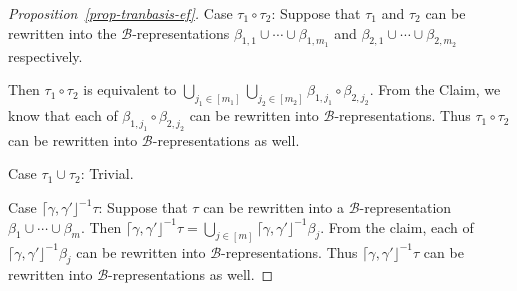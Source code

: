 \documentclass[preprint,12pt]{elsarticle}
\makeatletter
\newcommand\mathcircled[1]{%
  \mathpalette\@mathcircled{#1}%
}
\newcommand\@mathcircled[2]{%
  \tikz[baseline=(math.base)] \node[draw,circle,inner sep=0.2pt] (math) {$\m@th#1#2$};%
}
\newcommand\Tranbasis{{\mathscr{B} }}
\makeatother
\begin{document}
\begin{proof}[Proposition~\ref{prop-tranbasis-ef}]
	
	Case $\tau_1 \circ \tau_2$: Suppose that  $\tau_1$ and $\tau_2$ can be rewritten into the $\Tranbasis$-representations $ \beta_{1,1} \cup \cdots \cup \beta_{1, m_1}$ and $\beta_{2,1} \cup \cdots \cup \beta_{2, m_2}$  respectively.
	
	Then $\tau_1 \circ \tau_2$ is equivalent to $\bigcup \limits_{j_1 \in [m_1]} \bigcup \limits_{j_2 \in [m_2]} \beta_{1, j_1} \circ \beta_{2, j_2}$. From the Claim, we know that each of $ \beta_{1, j_1} \circ \beta_{2, j_2}$ can be rewritten into $\Tranbasis$-representations. Thus $\tau_1 \circ \tau_2$ can be rewritten into $\Tranbasis$-representations as well.
	
	Case $\tau_1 \cup \tau_2$: Trivial.
	
	Case $\lceil \gamma, \gamma' \rfloor^{-1} \tau$: Suppose that $\tau$ can be rewritten into a $\Tranbasis$-representation $ \beta_{1} \cup \cdots \cup \beta_{m}$. 
	Then $\lceil \gamma, \gamma' \rfloor^{-1} \tau = \bigcup \limits_{j \in [m]} \lceil \gamma, \gamma' \rfloor^{-1} \beta_j$. From the claim, each of $\lceil \gamma, \gamma' \rfloor^{-1} \beta_j$ can be rewritten into $\Tranbasis$-representations. Thus $\lceil \gamma, \gamma' \rfloor^{-1} \tau$ can be rewritten into $\Tranbasis$-representations as well.
\end{proof}
\end{document}
